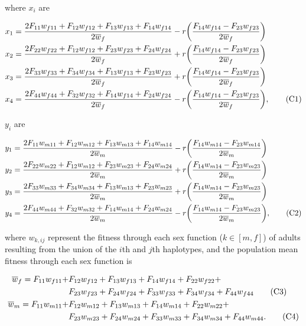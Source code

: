 \documentclass{article}
\newcommand\numberthis{\addtocounter{equation}{1}\tag{\theequation}}
\begin{document}
\noindent{} where $x_{i}$ are

\begin{align*}
	x_1 &= \frac{2 F_{11} w_{f11} + F_{12} w_{f12} + F_{13} w_{f13} + F_{14} w_{f14}}{2 \overline{w}_f} - r \bigg( \frac{F_{14} w_{f14} - F_{23} w_{f23}}{2 \overline{w}_f} \bigg) \\
	x_2 &= \frac{2 F_{22} w_{f22} + F_{12} w_{f12} + F_{23} w_{f23} + F_{24} w_{f24}}{2 \overline{w}_f} + r \bigg( \frac{F_{14} w_{f14} - F_{23} w_{f23}}{2 \overline{w}_f} \bigg) \\
	x_3 &= \frac{2 F_{33} w_{f33} + F_{34} w_{f34} + F_{13} w_{f13} + F_{23} w_{f23}}{2 \overline{w}_f} + r \bigg( \frac{F_{14} w_{f14} - F_{23} w_{f23}}{2 \overline{w}_f} \bigg) \\
	x_4 &= \frac{2 F_{44} w_{f44} + F_{32} w_{f32} + F_{14} w_{f14} + F_{24} w_{f24}}{2 \overline{w}_f} - r \bigg( \frac{F_{14} w_{f14} - F_{23} w_{f23}}{2 \overline{w}_f} \bigg), \numberthis
\end{align*}

\noindent{} $y_{i}$ are

\begin{align*}
	y_1 &= \frac{2 F_{11} w_{m11} + F_{12} w_{m12} + F_{13} w_{m13} + F_{14} w_{m14}}{2 \overline{w}_m} - r \bigg( \frac{F_{14} w_{m14} - F_{23} w_{m14}}{2 \overline{w}_m} \bigg) \\
	y_2 &= \frac{2 F_{22} w_{m22} + F_{12} w_{m12} + F_{23} w_{m23} + F_{24} w_{m24}}{2 \overline{w}_m} + r \bigg( \frac{F_{14} w_{m14} - F_{23} w_{m23}}{2 \overline{w}_m} \bigg) \\
	y_3 &= \frac{2 F_{33} w_{m33} + F_{34} w_{m34} + F_{13} w_{m13} + F_{23} w_{m23}}{2 \overline{w}_m} + r \bigg( \frac{F_{14} w_{m14} - F_{23} w_{m23}}{2 \overline{w}_m} \bigg) \\
	y_4 &= \frac{2 F_{44} w_{m44} + F_{32} w_{m32} + F_{14} w_{m14} + F_{24} w_{m24}}{2 \overline{w}_m} - r \bigg( \frac{F_{14} w_{m14} - F_{23} w_{m23}}{2 \overline{w}_m} \bigg), \numberthis
\end{align*}

\noindent{} where ${w}_{k,ij}$ represent the fitness through each sex function ($k \in [m,f]$) of adults resulting from the union of the $i$th and $j$th haplotypes, and the population mean fitness through each sex function is

\begin{align*}
	\overline{w}_f = F_{11} w_{f11} + &F_{12} w_{f12} + F_{13} w_{f13} + F_{14} w_{f14} + F_{22} w_{f22} + \\ 
				     &F_{23} w_{f23} + F_{24} w_{f24} + F_{33} w_{f33} + F_{34} w_{f34} + F_{44} w_{f44} \numberthis \\
	\overline{w}_m = F_{11} w_{m11} + &F_{12} w_{m12} + F_{13} w_{m13} + F_{14} w_{m14} + F_{22} w_{m22} + \\
				     &F_{23} w_{m23} + F_{24} w_{m24} + F_{33} w_{m33} + F_{34} w_{m34} + F_{44} w_{m44}. \numberthis
\end{align*}
\end{document}
